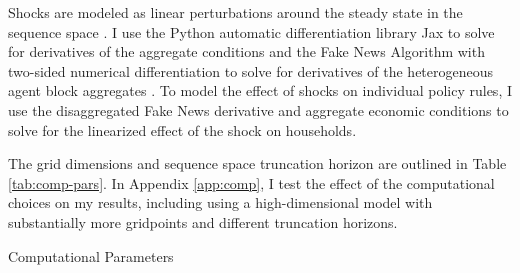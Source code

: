 Shocks are modeled as linear perturbations around the steady state in the sequence space \autocite{auclert2021using}. I use the Python automatic differentiation library Jax to solve for derivatives of the aggregate conditions and the Fake News Algorithm with two-sided numerical differentiation to solve for derivatives of the heterogeneous agent block aggregates \autocites{auclert2021using}. To model the effect of shocks on individual policy rules, I use the disaggregated Fake News derivative and aggregate economic conditions to solve for the linearized effect of the shock on households.

The grid dimensions and sequence space truncation horizon are outlined in Table \ref{tab:comp-pars}. In Appendix \ref{app:comp}, I test the effect of the computational choices on my results, including using a high-dimensional model with substantially more gridpoints and different truncation horizons.

\begin{table}[t]
    \centering
    \caption{Computational Parameters}
    
    \label{tab:comp-pars}
\end{table}
